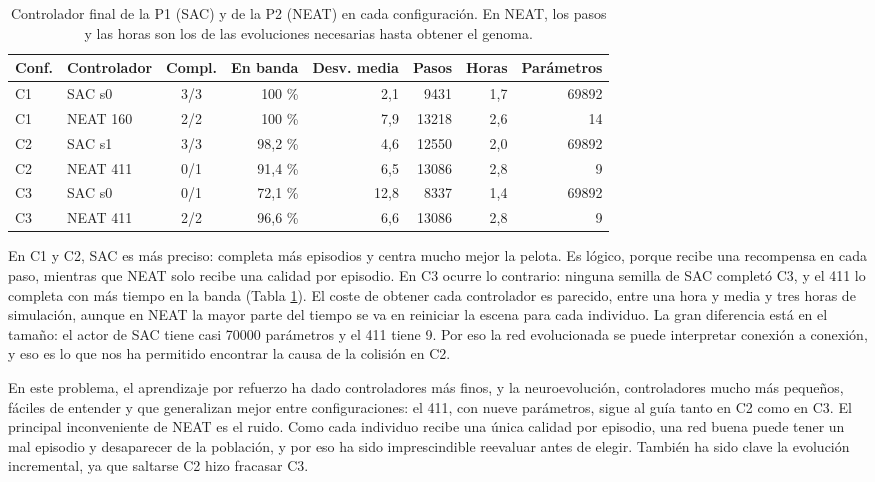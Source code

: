 \documentclass[11pt,a4paper]{article}
\makeatletter
\newcommand{\grados}{\textdegree}
\renewcommand\section{\@startsection{section}{1}{\z@}{-2ex plus -0.5ex}{1ex}{\normalfont\large\bfseries}}
\makeatother
\begin{document}
\begin{table}[h]
\centering\small
\caption{Controlador final de la P1 (SAC) y de la P2 (NEAT) en cada configuración. En NEAT, los pasos y las horas
son los de las evoluciones necesarias hasta obtener el genoma.}
\label{tab:p1}
\begin{tabular}{@{}llcrrrrr@{}}
\toprule
Conf. & Controlador & Compl. & En banda & Desv. media & Pasos & Horas & Parámetros \\
\midrule
C1 & SAC s0 & 3/3 & 100 \% & 2,1\grados & 9431 & 1,7 & 69892 \\
C1 & NEAT 160 & 2/2 & 100 \% & 7,9\grados & 13218 & 2,6 & 14 \\
\midrule
C2 & SAC s1 & 3/3 & 98,2 \% & 4,6\grados & 12550 & 2,0 & 69892 \\
C2 & NEAT 411 & 0/1 & 91,4 \% & 6,5\grados & 13086 & 2,8 & 9 \\
\midrule
C3 & SAC s0 & 0/1 & 72,1 \% & 12,8\grados & 8337 & 1,4 & 69892 \\
C3 & NEAT 411 & 2/2 & 96,6 \% & 6,6\grados & 13086 & 2,8 & 9 \\
\bottomrule
\end{tabular}
\end{table}

En C1 y C2, SAC es más preciso: completa más episodios y centra mucho mejor la pelota. Es lógico, porque recibe
una recompensa en cada paso, mientras que NEAT solo recibe una calidad por episodio. En C3 ocurre lo contrario:
ninguna semilla de SAC completó C3, y el 411 lo completa con más tiempo en la banda (Tabla \ref{tab:p1}). El coste
de obtener cada controlador es parecido, entre una hora y media y tres horas de simulación, aunque en NEAT la mayor
parte del tiempo se va en reiniciar la escena para cada individuo. La gran diferencia está en el tamaño: el actor
de SAC tiene casi 70000 parámetros y el 411 tiene 9. Por eso la red evolucionada se puede interpretar conexión a
conexión, y eso es lo que nos ha permitido encontrar la causa de la colisión en C2.

\section{Conclusiones}

En este problema, el aprendizaje por refuerzo ha dado controladores más finos, y la neuroevolución,
controladores mucho más pequeños, fáciles de entender y que generalizan mejor entre configuraciones: el 411, con
nueve parámetros, sigue al guía tanto en C2 como en C3. El principal inconveniente de NEAT es el ruido. Como
cada individuo recibe una única calidad por episodio, una red buena puede tener un mal episodio y desaparecer de
la población, y por eso ha sido imprescindible reevaluar antes de elegir. También ha sido clave la evolución
incremental, ya que saltarse C2 hizo fracasar C3.
\end{document}
